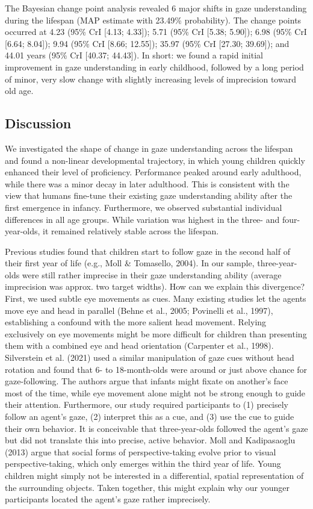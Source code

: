 \documentclass[
  man,mask,floatsintext]{apa7}
\begin{document}
The Bayesian change point analysis revealed 6 major shifts in gaze understanding during the lifespan (MAP estimate with 23.49\% probability). The change points occurred at 4.23 (95\% CrI {[}4.13; 4.33{]}); 5.71 (95\% CrI {[}5.38; 5.90{]}); 6.98 (95\% CrI {[}6.64; 8.04{]}); 9.94 (95\% CrI {[}8.66; 12.55{]}); 35.97 (95\% CrI {[}27.30; 39.69{]}); and 44.01 years (95\% CrI {[}40.37; 44.43{]}). In short: we found a rapid initial improvement in gaze understanding in early childhood, followed by a long period of minor, very slow change with slightly increasing levels of imprecision toward old age.

\hypertarget{discussion}{%
\subsection{Discussion}\label{discussion}}

We investigated the shape of change in gaze understanding across the lifespan and found a non-linear developmental trajectory, in which young children quickly enhanced their level of proficiency. Performance peaked around early adulthood, while there was a minor decay in later adulthood. This is consistent with the view that humans fine-tune their existing gaze understanding ability after the first emergence in infancy. Furthermore, we observed substantial individual differences in all age groups. While variation was highest in the three- and four-year-olds, it remained relatively stable across the lifespan.

Previous studies found that children start to follow gaze in the second half of their first year of life (e.g., Moll \& Tomasello, 2004). In our sample, three-year-olds were still rather imprecise in their gaze understanding ability (average imprecision was approx. two target widths). How can we explain this divergence? First, we used subtle eye movements as cues. Many existing studies let the agents move eye and head in parallel (Behne et al., 2005; Povinelli et al., 1997), establishing a confound with the more salient head movement. Relying exclusively on eye movements might be more difficult for children than presenting them with a combined eye and head orientation (Carpenter et al., 1998). Silverstein et al. (2021) used a similar manipulation of gaze cues without head rotation and found that 6- to 18-month-olds were around or just above chance for gaze-following. The authors argue that infants might fixate on another's face most of the time, while eye movement alone might not be strong enough to guide their attention. Furthermore, our study required participants to (1) precisely follow an agent's gaze, (2) interpret this as a cue, and (3) use the cue to guide their own behavior. It is conceivable that three-year-olds followed the agent's gaze but did not translate this into precise, active behavior. Moll and Kadipasaoglu (2013) argue that social forms of perspective-taking evolve prior to visual perspective-taking, which only emerges within the third year of life. Young children might simply not be interested in a differential, spatial representation of the surrounding objects. Taken together, this might explain why our younger participants located the agent's gaze rather imprecisely.
\end{document}

